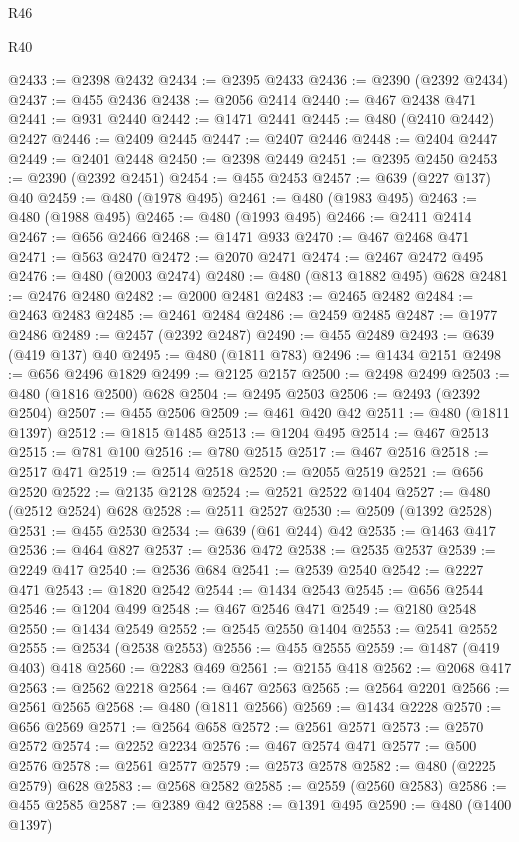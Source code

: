 \begin{lexlean}{R46}
\begin{lexlean}{R40}
\begin{coremodule}
{{{{{{{{{{{{{{{{{{{{{{{{{{{{{{{{{{{{{{{{{{{{{{{{{{{{{{{{{{{{{{{{{{{{{{{{{{{{{{{{{{{{{{{{{{{{{{{{{{{{{{{{{{{{{@2433 := @2398 @2432
@2434 := @2395 @2433
@2436 := @2390 (@2392 @2434)
@2437 := @455 @2436
@2438 := @2056 @2414
@2440 := @467 @2438 @471
@2441 := @931 @2440
@2442 := @1471 @2441
@2445 := @480 (@2410 @2442) @2427
@2446 := @2409 @2445
@2447 := @2407 @2446
@2448 := @2404 @2447
@2449 := @2401 @2448
@2450 := @2398 @2449
@2451 := @2395 @2450
@2453 := @2390 (@2392 @2451)
@2454 := @455 @2453
@2457 := @639 (@227 @137) @40
@2459 := @480 (@1978 @495)
@2461 := @480 (@1983 @495)
@2463 := @480 (@1988 @495)
@2465 := @480 (@1993 @495)
@2466 := @2411 @2414
@2467 := @656 @2466
@2468 := @1471 @933
@2470 := @467 @2468 @471
@2471 := @563 @2470
@2472 := @2070 @2471
@2474 := @2467 @2472 @495
@2476 := @480 (@2003 @2474)
@2480 := @480 (@813 @1882 @495) @628
@2481 := @2476 @2480
@2482 := @2000 @2481
@2483 := @2465 @2482
@2484 := @2463 @2483
@2485 := @2461 @2484
@2486 := @2459 @2485
@2487 := @1977 @2486
@2489 := @2457 (@2392 @2487)
@2490 := @455 @2489
@2493 := @639 (@419 @137) @40
@2495 := @480 (@1811 @783)
@2496 := @1434 @2151
@2498 := @656 @2496 @1829
@2499 := @2125 @2157
@2500 := @2498 @2499
@2503 := @480 (@1816 @2500) @628
@2504 := @2495 @2503
@2506 := @2493 (@2392 @2504)
@2507 := @455 @2506
@2509 := @461 @420 @42
@2511 := @480 (@1811 @1397)
@2512 := @1815 @1485
@2513 := @1204 @495
@2514 := @467 @2513
@2515 := @781 @100
@2516 := @780 @2515
@2517 := @467 @2516
@2518 := @2517 @471
@2519 := @2514 @2518
@2520 := @2055 @2519
@2521 := @656 @2520
@2522 := @2135 @2128
@2524 := @2521 @2522 @1404
@2527 := @480 (@2512 @2524) @628
@2528 := @2511 @2527
@2530 := @2509 (@1392 @2528)
@2531 := @455 @2530
@2534 := @639 (@61 @244) @42
@2535 := @1463 @417
@2536 := @464 @827
@2537 := @2536 @472
@2538 := @2535 @2537
@2539 := @2249 @417
@2540 := @2536 @684
@2541 := @2539 @2540
@2542 := @2227 @471
@2543 := @1820 @2542
@2544 := @1434 @2543
@2545 := @656 @2544
@2546 := @1204 @499
@2548 := @467 @2546 @471
@2549 := @2180 @2548
@2550 := @1434 @2549
@2552 := @2545 @2550 @1404
@2553 := @2541 @2552
@2555 := @2534 (@2538 @2553)
@2556 := @455 @2555
@2559 := @1487 (@419 @403) @418
@2560 := @2283 @469
@2561 := @2155 @418
@2562 := @2068 @417
@2563 := @2562 @2218
@2564 := @467 @2563
@2565 := @2564 @2201
@2566 := @2561 @2565
@2568 := @480 (@1811 @2566)
@2569 := @1434 @2228
@2570 := @656 @2569
@2571 := @2564 @658
@2572 := @2561 @2571
@2573 := @2570 @2572
@2574 := @2252 @2234
@2576 := @467 @2574 @471
@2577 := @500 @2576
@2578 := @2561 @2577
@2579 := @2573 @2578
@2582 := @480 (@2225 @2579) @628
@2583 := @2568 @2582
@2585 := @2559 (@2560 @2583)
@2586 := @455 @2585
@2587 := @2389 @42
@2588 := @1391 @495
@2590 := @480 (@1400 @1397)
}}}}}}}}}}}}}}}}}}}}}}}}}}}}}}}}}}}}}}}}}}}}}}}}}}}}}}}}}}}}}}}}}}}}}}}}}}}}}}}}}}}}}}}}}}}}}}}}}}}}}}}}}}}}}
\end{coremodule}
\end{lexlean}
\end{lexlean}
